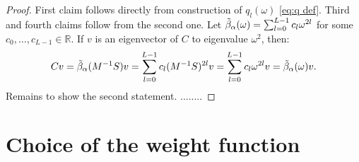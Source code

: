 \documentclass[a4paper,11pt,bibliography=totoc,listof=totoc,headinclude=true,cleardoublepage=empty,oneside]{scrbook}
\newcommand{\R}{\mathbb{R}}
\newcommand{\dff}{\Tilde{\beta}_\alpha}
\begin{document}
\begin{proof}
    First claim follows directly from construction of $q_l(\omega)$ \eqref{eq:q def}. Third and fourth claims follow from the second one. Let $\dff(\omega) = \sum_{l=0}^{L-1} c_l \omega^{2l}$ for some $c_0, \dots, c_{L-1}\in \R$. If $v$ is an eigenvector of $C$ to eigenvalue $\omega^2$, then:
    \begin{equation*}
        Cv = \dff(M^{-1}S)v = \sum_{l=0}^{L-1} c_l (M^{-1}S)^{2l}v = \sum_{l=0}^{L-1} c_l \omega^{2l}v = \dff(\omega)v.
    \end{equation*}
    Remains to show the second statement. 
    ........
\end{proof}



\chapter{Choice of the weight function}
\label{chapter:function}
\cite{nannen}\cite{numodes}

 
%

\end{document}
